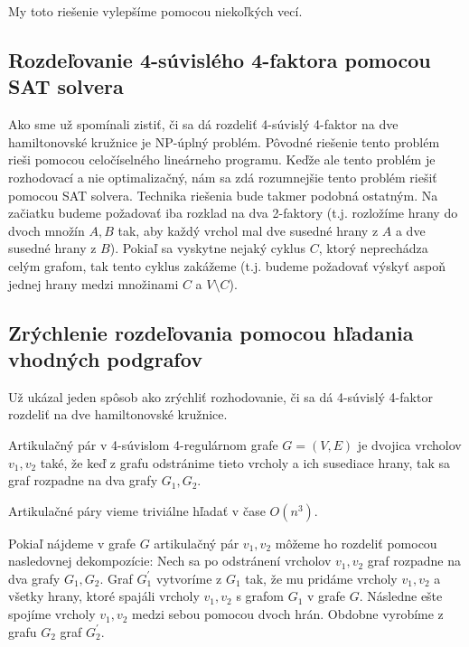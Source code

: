 My toto riešenie vylepšíme pomocou niekoľkých vecí.

\subsection{Rozdeľovanie 4-súvislého 4-faktora pomocou SAT solvera}

Ako sme už spomínali zistiť, či sa dá rozdeliť 4-súvislý 4-faktor na dve hamiltonovské kružnice
je NP-úplný problém. Pôvodné riešenie tento problém rieši pomocou celočíselného lineárneho programu.
Keďže ale tento problém je rozhodovací a nie optimalizačný, nám sa zdá rozumnejšie tento 
problém riešiť pomocou SAT solvera. Technika riešenia bude takmer podobná ostatným.
Na začiatku budeme požadovať iba rozklad na dva 2-faktory (t.j. rozložíme hrany do dvoch množín $A,
B$ tak, aby každý vrchol mal dve susedné hrany z $A$ a dve susedné hrany z $B$). Pokiaľ sa vyskytne
nejaký cyklus $C$, ktorý neprechádza celým grafom, tak tento cyklus zakážeme (t.j. budeme požadovať
výskyť aspoň jednej hrany medzi množinami $C$ a $V \setminus C$). 

\subsection{Zrýchlenie rozdeľovania pomocou hľadania vhodných podgrafov}

Už \cite{duchenne} ukázal jeden spôsob ako zrýchliť rozhodovanie, či sa dá 4-súvislý 4-faktor
rozdeliť na dve hamiltonovské kružnice.

\begin{definicia}
Artikulačný pár v 4-súvislom 4-regulárnom grafe $G = (V, E)$ 
je dvojica vrcholov $v_1, v_2$ také, že keď z grafu odstránime
tieto vrcholy a ich susediace hrany, tak sa graf rozpadne na dva grafy
$G_1, G_2$.
\end{definicia}

Artikulačné páry vieme triviálne hľadať v čase $O(n^3)$.

Pokiaľ nájdeme v grafe $G$ artikulačný pár $v_1, v_2$ môžeme ho rozdeliť pomocou nasledovnej
dekompozície:
Nech sa po odstránení vrcholov $v_1, v_2$ graf rozpadne na dva grafy $G_1, G_2$.
Graf $G_1^{'}$ vytvoríme z $G_1$ tak, že mu pridáme vrcholy $v_1, v_2$ a všetky hrany, ktoré spajáli
vrcholy $v_1, v_2$ s grafom $G_1$ v grafe $G$. Následne ešte spojíme vrcholy $v_1, v_2$ medzi sebou
pomocou dvoch hrán. Obdobne vyrobíme z grafu $G_2$ graf $G_2^{'}$.


